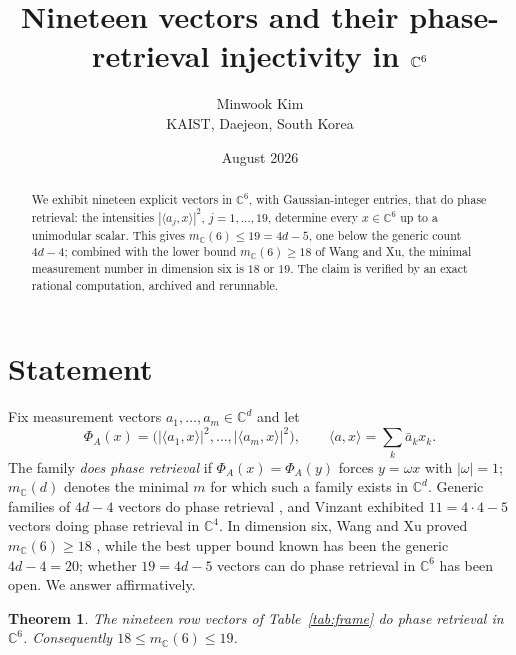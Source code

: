 \documentclass[10pt]{amsart}
\title[Nineteen vectors for phase retrieval in $\C^6$]{Nineteen vectors and their phase-retrieval injectivity in $\C^6$}
\author[Minwook Kim]{Minwook Kim\\[3pt]
{\small KAIST, Daejeon, South Korea}}
\date{August 2026}
\newtheorem{theorem}{Theorem}
\newcommand{\C}{\mathbb C}
\begin{document}
\begin{abstract}
We exhibit nineteen explicit vectors in $\C^6$, with Gaussian-integer
entries, that do phase retrieval: the intensities
$|\langle a_j,x\rangle|^2$, $j=1,\dots,19$, determine every $x\in\C^6$
up to a unimodular scalar. This gives $m_{\C}(6)\le19=4d-5$, one below
the generic count $4d-4$; combined with the lower bound
$m_{\C}(6)\ge18$ of Wang and Xu, the minimal measurement number in
dimension six is $18$ or $19$. The claim is verified by an exact
rational computation, archived and rerunnable.
\end{abstract}

\maketitle

\section{Statement}

Fix measurement vectors $a_1,\dots,a_m\in\C^d$ and let
\[
\Phi_A(x)=\bigl(|\langle a_1,x\rangle|^2,\dots,|\langle
a_m,x\rangle|^2\bigr),\qquad
\langle a,x\rangle=\textstyle\sum_k\bar a_kx_k .
\]
The family \emph{does phase retrieval} if $\Phi_A(x)=\Phi_A(y)$ forces
$y=\omega x$ with $|\omega|=1$; $m_\C(d)$ denotes the minimal $m$ for
which such a family exists in $\C^d$. Generic families of $4d-4$
vectors do phase retrieval \cite{CEHV}, and Vinzant \cite{Vinzant}
exhibited $11=4\cdot4-5$ vectors doing phase retrieval in $\C^4$. In
dimension six, Wang and Xu proved $m_\C(6)\ge18$
\cite[Theorem~5.2]{WangXu}, while the best upper bound known has been
the generic $4d-4=20$; whether $19=4d-5$ vectors can do phase
retrieval in $\C^6$ has been open. We answer affirmatively.

\begin{theorem}\label{thm:main}
The nineteen row vectors of Table~\textup{\ref{tab:frame}} do phase
retrieval in $\C^6$. Consequently $18\le m_\C(6)\le19$.
\end{theorem}
\end{document}
